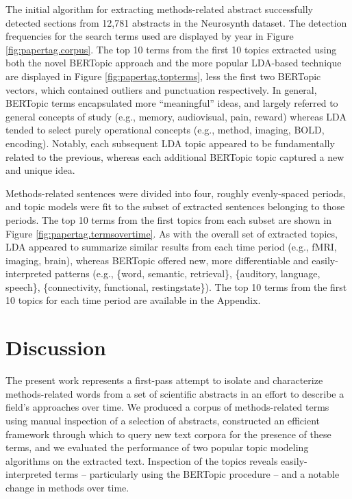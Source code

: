 The initial algorithm for extracting methods-related abstract successfully detected sections from 12,781 abstracts in the Neurosynth dataset. The detection frequencies for the search terms used are displayed by year in Figure \ref{fig:papertag.corpus}. The top 10 terms from the first 10 topics extracted using both the novel BERTopic approach and the more popular LDA-based technique are displayed in Figure \ref{fig:papertag.topterms}, less the first two BERTopic vectors, which contained outliers and punctuation respectively. In general, BERTopic terms encapsulated more ``meaningful'' ideas, and largely referred to general concepts of study (e.g.,  memory, audiovisual, pain, reward) whereas LDA tended to select purely operational concepts (e.g., method, imaging, BOLD, encoding). Notably, each subsequent LDA topic appeared to be fundamentally related to the previous, whereas each additional BERTopic topic captured a new and unique idea.

Methods-related sentences were divided into four, roughly evenly-spaced periods, and topic models were fit to the subset of extracted sentences belonging to those periods. The top 10 terms from the first topics from each subset are shown in Figure \ref{fig:papertag.termsovertime}. As with the overall set of extracted topics, LDA appeared to summarize similar results from each time period (e.g., fMRI, imaging, brain), whereas BERTopic offered new, more differentiable and easily-interpreted patterns (e.g., \{word, semantic, retrieval\}, \{auditory, language, speech\}, \{connectivity, functional, restingstate\}). The top 10 terms from the first 10 topics for each time period are available in the Appendix.


\section{Discussion}
\label{sec:papertag.discussion}

The present work represents a first-pass attempt to isolate and characterize methods-related words from a set of scientific abstracts in an effort to describe a field's approaches over time. We produced a corpus of methods-related terms using manual inspection of a selection of abstracts, constructed an efficient framework through which to query new text corpora for the presence of these terms, and we evaluated the performance of two popular topic modeling algorithms on the extracted text. Inspection of the topics reveals easily-interpreted terms -- particularly using the BERTopic procedure -- and a notable change in methods over time. 

